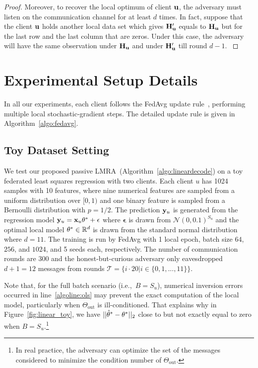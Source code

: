 \begin{proof}
Moreover, to recover the local optimum of client $\mathbf{u}$, the adversary must listen on the communication channel for at least $d$ times.  
In fact, suppose that the client $\mathbf{u}$ holds another local data set which gives $\mathbf{H}_{\mathbf{u}}'$ equals to $\mathbf{H}_{\mathbf{u}}$ but for the last row and the last column that are zeros. Under this case, the adversary will have the same observation under $\mathbf{H}_{\mathbf{u}}$ and under $\mathbf{H}_{\mathbf{u}}'$ till round $d-1$.  
\label{proof_com}
\end{proof}


\section{Experimental Setup Details}
In all our experiments, each client follows the FedAvg update rule~\cite{pmlr-v54-mcmahan17a}, performing multiple local stochastic-gradient steps. The detailed update rule is given in Algorithm~\ref{algo:fedavg}.

\subsection{Toy Dataset Setting}\label{app:toydataset}
We test our proposed passive LMRA~(Algorithm~\ref{algo:lineardecode}) on a toy federated least squares regression with two clients. Each client $u$ has 1024 samples with 10 features, where nine numerical features are sampled from a uniform distribution over $[0,1)$ and one binary feature is sampled from a Bernoulli distribution with $p=1/2$. The prediction $\mathbf{y}_u$ is generated from the regression model $\mathbf{y}_u = {\mathbf{x}}_u\theta^*+\mathbf{\epsilon}$ where $\mathbf{\epsilon}$ is drawn from $\mathcal{N}(0, 0.1)^{S_u}$ and the optimal local model $\theta^*\in \mathbb{R}^{d}$ is drawn from the standard normal distribution where $d=11$. 
The training is run by FedAvg with 1 local epoch, batch size $64$, $256$, and $1024$, and 5 seeds each, respectively. The number of communication rounds are 300 and  the honest-but-curious adversary only eavesdropped $d+1=12$ messages from rounds $\mathcal{T}=\{i\cdot20 | i\in \{0,1,...,11\}\}$.

Note that, for the full batch scenario (i.e.,~$B=S_u$), numerical inversion errors occurred in line~\ref{algoline:ols} may prevent the exact computation of the local model, particularly when $\Theta_{\text{out}}$ is ill-conditioned. That explains why in Figure~\ref{fig:linear_toy}, we have $||\hat{\theta}^*-\theta^*||_2$ close to but not exactly equal to zero when $B=S_u$.\footnote{In real practice, the adversary can optimize the set of the messages considered to minimize the condition number of $\Theta_{\text{out}}$.}



